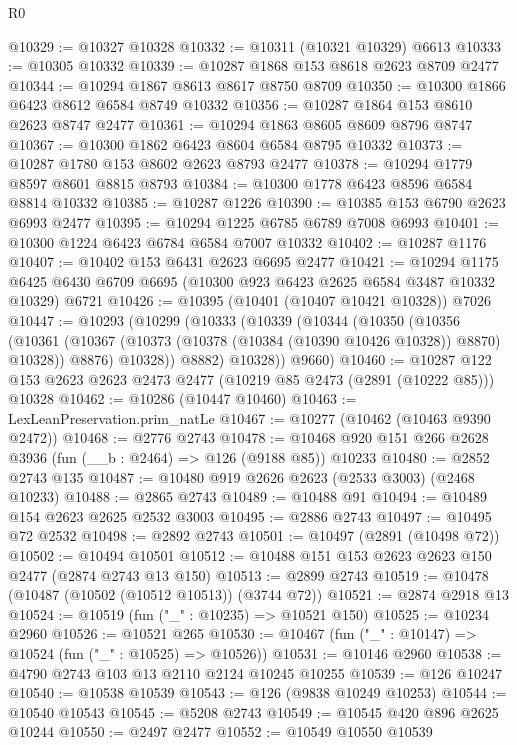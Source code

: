\begin{lexlean}{R0}
\begin{coremodule}
@10329 := @10327 @10328
@10332 := @10311 (@10321 @10329) @6613
@10333 := @10305 @10332
@10339 := @10287 @1868 @153 @8618 @2623 @8709 @2477
@10344 := @10294 @1867 @8613 @8617 @8750 @8709
@10350 := @10300 @1866 @6423 @8612 @6584 @8749 @10332
@10356 := @10287 @1864 @153 @8610 @2623 @8747 @2477
@10361 := @10294 @1863 @8605 @8609 @8796 @8747
@10367 := @10300 @1862 @6423 @8604 @6584 @8795 @10332
@10373 := @10287 @1780 @153 @8602 @2623 @8793 @2477
@10378 := @10294 @1779 @8597 @8601 @8815 @8793
@10384 := @10300 @1778 @6423 @8596 @6584 @8814 @10332
@10385 := @10287 @1226
@10390 := @10385 @153 @6790 @2623 @6993 @2477
@10395 := @10294 @1225 @6785 @6789 @7008 @6993
@10401 := @10300 @1224 @6423 @6784 @6584 @7007 @10332
@10402 := @10287 @1176
@10407 := @10402 @153 @6431 @2623 @6695 @2477
@10421 := @10294
    @1175
    @6425
    @6430
    @6709
    @6695
    (@10300 @923 @6423 @2625 @6584 @3487 @10332 @10329)
    @6721
@10426 := @10395 (@10401 (@10407 @10421 @10328)) @7026
@10447 := @10293
    (@10299
      (@10333
        (@10339
          (@10344
            (@10350
              (@10356
                (@10361
                  (@10367 (@10373 (@10378 (@10384 (@10390 @10426 @10328)) @8870) @10328))
                  @8876)
                @10328))
            @8882)
          @10328))
      @9660)
@10460 := @10287 @122 @153 @2623 @2623 @2473 @2477 (@10219 @85 @2473 (@2891 (@10222 @85))) @10328
@10462 := @10286 (@10447 @10460)
@10463 := LexLeanPreservation.prim_natLe
@10467 := @10277 (@10462 (@10463 @9390 @2472))
@10468 := @2776 @2743
@10478 := @10468 @920 @151 @266 @2628 @3936 (fun (__b : @2464) => @126 (@9188 @85)) @10233
@10480 := @2852 @2743 @135
@10487 := @10480 @919 @2626 @2623 (@2533 @3003) (@2468 @10233)
@10488 := @2865 @2743
@10489 := @10488 @91
@10494 := @10489 @154 @2623 @2625 @2532 @3003
@10495 := @2886 @2743
@10497 := @10495 @72 @2532
@10498 := @2892 @2743
@10501 := @10497 (@2891 (@10498 @72))
@10502 := @10494 @10501
@10512 := @10488 @151 @153 @2623 @2623 @150 @2477 (@2874 @2743 @13 @150)
@10513 := @2899 @2743
@10519 := @10478 (@10487 (@10502 (@10512 @10513)) (@3744 @72))
@10521 := @2874 @2918 @13
@10524 := @10519 (fun ("_" : @10235) => @10521 @150)
@10525 := @10234 @2960
@10526 := @10521 @265
@10530 := @10467 (fun ("_" : @10147) => @10524 (fun ("_" : @10525) => @10526))
@10531 := @10146 @2960
@10538 := @4790 @2743 @103 @13 @2110 @2124 @10245 @10255
@10539 := @126 @10247
@10540 := @10538 @10539
@10543 := @126 (@9838 @10249 @10253)
@10544 := @10540 @10543
@10545 := @5208 @2743
@10549 := @10545 @420 @896 @2625 @10244
@10550 := @2497 @2477
@10552 := @10549 @10550 @10539

\end{coremodule}
\end{lexlean}
